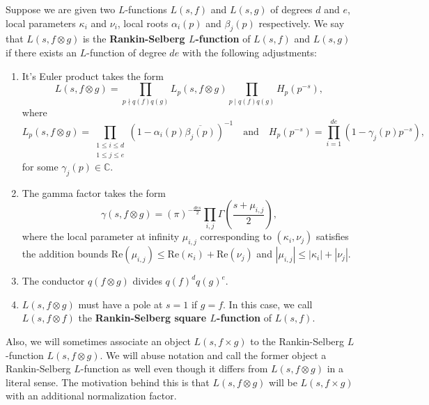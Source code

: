 \documentclass[12pt]{book}
\theoremstyle{definition}\newframedtheorem{method}{Method}
\newcommand{\C}{\mathbb{C}}
\renewcommand{\a}{\alpha}
\renewcommand{\b}{\beta}
\newcommand{\g}{\gamma}
\renewcommand{\k}{\kappa}
\newcommand{\G}{\Gamma}
\newcommand{\x}{\times}
\newcommand{\ox}{\otimes}
\newcommand{\<}{\langle}
\renewcommand{\>}{\rangle}
\newcommand{\conj}{\overline}
\renewcommand{\Re}{\mathrm{Re}}
\begin{document}
      Suppose we are given two $L$-functions $L(s,f)$ and $L(s,g)$ of degrees $d$ and $e$, local parameters $\k_{i}$ and $\nu_{i}$, local roots $\a_{i}(p)$ and $\b_{j}(p)$ respectively. We say that $L(s,f \ox g)$ is the \textbf{Rankin-Selberg $L$-function} of $L(s,f)$ and $L(s,g)$ if there exists an $L$-function of degree $de$ with the following adjustments:
      \begin{enumerate}[label=(\roman*)]
        \item It's Euler product takes the form
        \[
          L(s,f \ox g) = \prod_{p \nmid q(f)q(g)}L_{p}(s,f \ox g)\prod_{p \mid q(f)q(g)}H_{p}(p^{-s}),
        \]
        where
        \[
          L_{p}(s,f \ox g) = \prod_{\substack{1 \le i \le d \\ 1 \le j \le e}}(1-\a_{i}(p)\conj{\b_{j}(p)})^{-1} \quad \text{and} \quad H_{p}(p^{-s}) = \prod_{i = 1}^{de}(1-\g_{j}(p)p^{-s}),
        \]
        for some $\g_{j}(p) \in \C$.
        \item The gamma factor takes the form
        \[
          \g(s,f \ox g) = (\pi)^{-\frac{des}{2}}\prod_{i,j}\G\left(\frac{s+\mu_{i,j}}{2}\right),
        \]
        where the local parameter at infinity $\mu_{i,j}$ corresponding to $(\k_{i},\nu_{j})$ satisfies the addition bounds $\Re(\mu_{i,j}) \le \Re(\k_{i})+\Re(\nu_{j})$ and $|\mu_{i,j}| \le |\k_{i}|+|\nu_{j}|$.
        \item The conductor $q(f \ox g)$ divides $q(f)^{d}q(g)^{e}$.
        \item $L(s,f \ox g)$ must have a pole at $s = 1$ if $g = f$. In this case, we call $L(s,f \ox f)$ the \textbf{Rankin-Selberg square $L$-function} of $L(s,f)$.
      \end{enumerate}
      Also, we will sometimes associate an object $L(s,f \x g)$ to the Rankin-Selberg $L$-function $L(s,f \ox g)$. We will abuse notation and call the former object a Rankin-Selberg $L$-function as well even though it differs from $L(s,f \ox g)$ in a literal sense. The motivation behind this is that $L(s,f \ox g)$ will be $L(s,f \x g)$ with an additional normalization factor.
\end{document}

